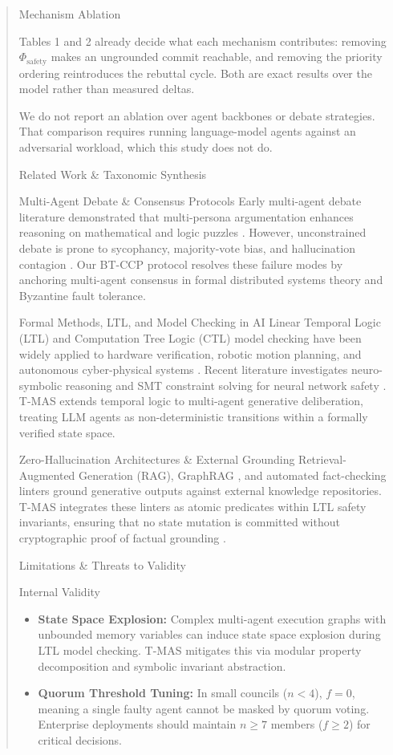 \documentclass[manuscript,review]{acmart}
\begin{document}
\begin{quote}
{ Mechanism Ablation

Tables 1 and 2 already decide what each mechanism contributes: removing $\Phi_{\text{safety}}$ makes an ungrounded commit reachable, and removing the priority ordering reintroduces the rebuttal cycle. Both are exact results over the model rather than measured deltas.

We do not report an ablation over agent backbones or debate strategies. That comparison requires running language-model agents against an adversarial workload, which this study does not do.



 Related Work \& Taxonomic Synthesis

 Multi-Agent Debate \& Consensus Protocols
Early multi-agent debate literature demonstrated that multi-persona argumentation enhances reasoning on mathematical and logic puzzles \cite{arxiv_2005_14165,arxiv_2203_02155}. However, unconstrained debate is prone to sycophancy, majority-vote bias, and hallucination contagion \cite{arxiv_2406_00584}. Our BT-CCP protocol resolves these failure modes by anchoring multi-agent consensus in formal distributed systems theory and Byzantine fault tolerance.

 Formal Methods, LTL, and Model Checking in AI
Linear Temporal Logic (LTL) and Computation Tree Logic (CTL) model checking have been widely applied to hardware verification, robotic motion planning, and autonomous cyber-physical systems \cite{crossref_10_18653_v1_2026_findings_acl_1933}. Recent literature investigates neuro-symbolic reasoning and SMT constraint solving for neural network safety \cite{arxiv_2404_01131}. T-MAS extends temporal logic to multi-agent generative deliberation, treating LLM agents as non-deterministic transitions within a formally verified state space.

 Zero-Hallucination Architectures \& External Grounding
Retrieval-Augmented Generation (RAG), GraphRAG \cite{arxiv_2501_14050}, and automated fact-checking linters ground generative outputs against external knowledge repositories. T-MAS integrates these linters as atomic predicates within LTL safety invariants, ensuring that no state mutation is committed without cryptographic proof of factual grounding \cite{arxiv_2405_01543,crossref_10_1201_9788743808145_14}.



 Limitations \& Threats to Validity

 Internal Validity
\begin{itemize}
  \item \textbf{State Space Explosion:} Complex multi-agent execution graphs with unbounded memory variables can induce state space explosion during LTL model checking. T-MAS mitigates this via modular property decomposition and symbolic invariant abstraction.
  \item \textbf{Quorum Threshold Tuning:} In small councils ($n < 4$), $f = 0$, meaning a single faulty agent cannot be masked by quorum voting. Enterprise deployments should maintain $n \ge 7$ members ($f \ge 2$) for critical decisions.
\end{itemize}

}
\end{quote}
\end{document}
